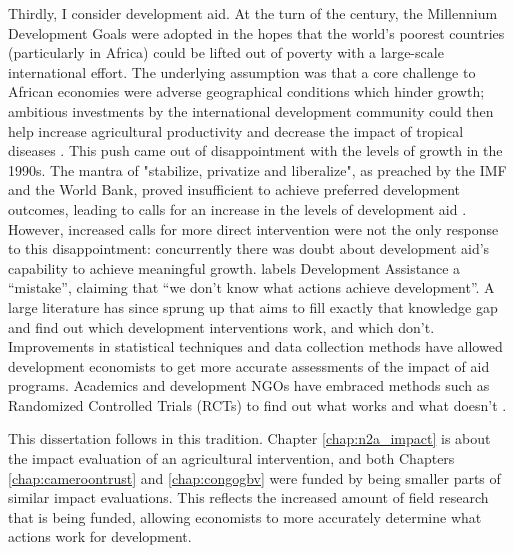 Thirdly, I consider development aid. At the turn of the century, the Millennium Development Goals were adopted in the hopes that the world's poorest countries (particularly in Africa) could be lifted out of poverty with a large-scale international effort. The underlying assumption was that a core challenge to African economies were adverse geographical conditions which hinder growth; ambitious investments by the international development community could then help increase agricultural productivity and decrease the impact of tropical diseases \citep{Sachs2005}. This push came out of disappointment with the levels of growth in the 1990s. The mantra of "stabilize, privatize and liberalize", as preached by the IMF and the World Bank, proved insufficient to achieve preferred development outcomes, leading to calls  for an increase in the levels of development aid \citep{Rodrik2006a}. However, increased calls for more direct intervention were not the only response to this disappointment: concurrently there was doubt about development aid's capability to achieve meaningful growth. \citet{Easterly2007} labels Development Assistance a ``mistake'', claiming that ``we don't know what actions achieve development''. A large literature has since sprung up that aims to fill exactly that knowledge gap and find out which development interventions work, and which don't. Improvements in statistical techniques and data collection methods have allowed development economists to get more accurate assessments of the impact of aid programs. Academics and development NGOs have embraced methods such as Randomized Controlled Trials (RCTs) to find out what works and what doesn't \citep[see e.g.][]{Bannerjee2011}.  

This dissertation follows in this tradition. Chapter \ref{chap:n2a_impact} is about the impact evaluation of an agricultural intervention, and both Chapters \ref{chap:cameroontrust} and \ref{chap:congogbv} were funded by being smaller parts of similar impact evaluations. This reflects the increased amount of field research that is being funded, allowing economists to more accurately determine what actions work for development.

